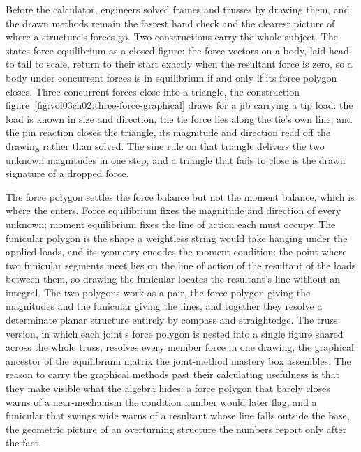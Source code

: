 Before the calculator, engineers solved frames and trusses by drawing them,
and the drawn methods remain the fastest hand check and the clearest picture
of where a structure's forces go. Two constructions carry the whole subject.
The  states force equilibrium as a closed figure: the
force vectors on a body, laid head to tail to scale, return to their start
exactly when the resultant force is zero, so a body under concurrent forces is
in equilibrium if and only if its force polygon closes. Three concurrent
forces close into a triangle, the construction
figure~\ref{fig:vol03ch02:three-force-graphical} draws for a jib carrying a tip
load: the load is known in size and direction, the tie force lies along the
tie's own line, and the pin reaction closes the triangle, its magnitude and
direction read off the drawing rather than solved. The sine rule on that
triangle delivers the two unknown magnitudes in one step, and a triangle that
fails to close is the drawn signature of a dropped force.



The force polygon settles the force balance but not the moment balance, which
is where the  enters. Force equilibrium fixes the
magnitude and direction of every unknown; moment equilibrium fixes the line of
action each must occupy. The funicular polygon is the shape a weightless string
would take hanging under the applied loads, and its geometry encodes the moment
condition: the point where two funicular segments meet lies on the line of
action of the resultant of the loads between them, so drawing the funicular
locates the resultant's line without an integral. The two polygons work as a
pair, the force polygon giving the magnitudes and the funicular giving the
lines, and together they resolve a determinate planar structure entirely by
compass and straightedge. The truss version, in which each joint's force
polygon is nested into a single figure shared across the whole truss, resolves
every member force in one drawing, the graphical ancestor of the equilibrium
matrix the joint-method mastery box assembles. The reason to carry the graphical
methods past their calculating usefulness is that they make visible what the
algebra hides: a force polygon that barely closes warns of a near-mechanism the
condition number would later flag, and a funicular that swings wide warns of a
resultant whose line falls outside the base, the geometric picture of an
overturning structure the numbers report only after the fact.

